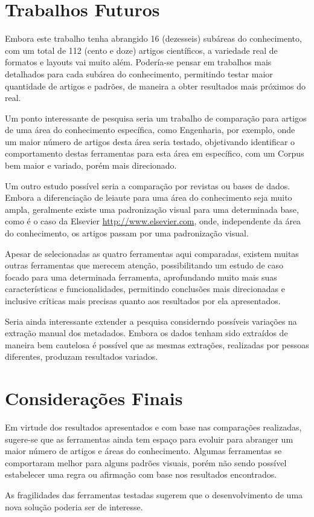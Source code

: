 \section{Trabalhos Futuros}
\label{sec:future-work}

Embora este trabalho tenha abrangido 16 (dezesseis) subáreas do conhecimento, com um total de 112 (cento e doze) artigos científicos, a variedade real de formatos e layouts vai muito além.
Podería-se pensar em trabalhos mais detalhados para cada subárea do conhecimento, permitindo testar maior quantidade de artigos e padrões, de maneira a obter resultados mais próximos do real.

Um ponto interessante de pesquisa seria um trabalho de comparação para artigos de uma área do conhecimento específica, como Engenharia, por exemplo, onde um maior número de artigos desta área seria testado, 
objetivando identificar o comportamento destas ferramentas para esta área em específico, com um Corpus bem maior e variado, porém mais direcionado.

Um outro estudo possível seria a comparação por revistas ou bases de dados. 
Embora a diferenciação de leiaute para uma área do conhecimento seja muito ampla, geralmente existe uma padronização visual para uma determinada base, 
como é o caso da Elsevier \url{http://www.elsevier.com}, onde, independente da área do conhecimento, os artigos passam por uma padronização visual. 

Apesar de selecionadas as quatro ferramentas aqui comparadas, existem muitas outras ferramentas que merecem atenção, possibilitando um estudo de caso focado para uma determinada ferramenta, 
aprofundando muito mais suas características e funcionalidades, permitindo conclusões mais direcionadas e inclusive críticas mais precisas quanto aos resultados por ela apresentados.

Seria ainda interessante extender a pesquisa considerndo possíveis variações na extração manual dos metadados. 
Embora os dados tenham sido extraídos de maneira bem cautelosa é possível que as mesmas extrações, realizadas por pessoas diferentes, produzam resultados variados.

\section{Considerações Finais}
\label{sec:final-considerations}

Em virtude dos resultados apresentados e com base nas comparações realizadas, sugere-se que as ferramentas ainda tem espaço para evoluir para abranger um maior número de artigos e áreas do conhecimento. 
Algumas ferramentas se comportaram melhor para alguns padrões visuais, porém não sendo possível estabelecer uma regra ou afirmação com base nos resultados encontrados.

As fragilidades das ferramentas testadas sugerem que o desenvolvimento de uma nova solução poderia ser de interesse.

